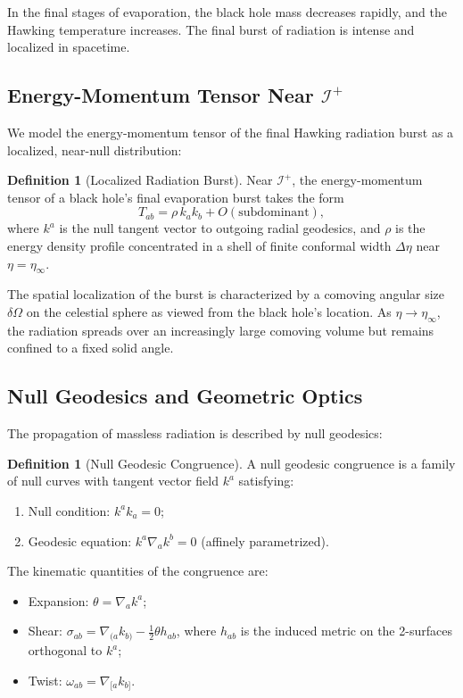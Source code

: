 \documentclass[11pt,a4paper]{article}
\theoremstyle{plain}
\theoremstyle{definition}
\newtheorem{definition}[theorem]{Definition}
\theoremstyle{remark}
\newcommand{\scriplus}{\mathcal{I}^+}
\begin{document}
In the final stages of evaporation, the black hole mass decreases rapidly, and the Hawking temperature increases. The final burst of radiation is intense and localized in spacetime.

\subsection{Energy-Momentum Tensor Near \texorpdfstring{$\scriplus$}{I+}}

We model the energy-momentum tensor of the final Hawking radiation burst as a localized, near-null distribution:

\begin{definition}[Localized Radiation Burst]\label{def:radiation_burst}
Near $\scriplus$, the energy-momentum tensor of a black hole's final evaporation burst takes the form
\begin{equation}\label{eq:tab_burst}
    T_{ab} = \rho \, k_a k_b + O(\text{subdominant}),
\end{equation}
where $k^a$ is the null tangent vector to outgoing radial geodesics, and $\rho$ is the energy density profile concentrated in a shell of finite conformal width $\Delta\eta$ near $\eta = \eta_\infty$.
\end{definition}

The spatial localization of the burst is characterized by a comoving angular size $\delta\Omega$ on the celestial sphere as viewed from the black hole's location. As $\eta \to \eta_\infty$, the radiation spreads over an increasingly large comoving volume but remains confined to a fixed solid angle.

\subsection{Null Geodesics and Geometric Optics}

The propagation of massless radiation is described by null geodesics:

\begin{definition}[Null Geodesic Congruence]\label{def:null_congruence}
A null geodesic congruence is a family of null curves with tangent vector field $k^a$ satisfying:
\begin{enumerate}
    \item Null condition: $k^a k_a = 0$;
    \item Geodesic equation: $k^a \nabla_a k^b = 0$ (affinely parametrized).
\end{enumerate}
The kinematic quantities of the congruence are:
\begin{itemize}
    \item Expansion: $\theta = \nabla_a k^a$;
    \item Shear: $\sigma_{ab} = \nabla_{(a} k_{b)} - \frac{1}{2}\theta h_{ab}$, where $h_{ab}$ is the induced metric on the 2-surfaces orthogonal to $k^a$;
    \item Twist: $\omega_{ab} = \nabla_{[a} k_{b]}$.
\end{itemize}
\end{definition}
\end{document}
